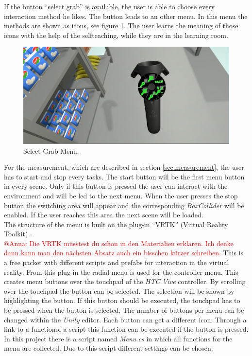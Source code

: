 If the button ``select grab'' is available, the user is able to choose every interaction method he likes. The button leads to an other menu. In this menu the methods are shown as icons, see figure \ref{fig:grabMenu}. The user learns the meaning of those icons with the help of the selfteaching, while they are in the learning room. 

\begin{figure}[H] 
	\center 
	\includegraphics[width=12cm]{Images/Menu2.PNG}
	\caption[Select Grab Menu.]{Select Grab Menu.}
	\label{fig:grabMenu}
\end{figure}

For the measurement, which are described in section \ref{sec:measurement}, the user has to start and stop every tasks. The start button will be the first menu button in every scene. Only if this button is pressed the user can interact with the environment and will be led to the next menu. When the user presses the stop button the switching area will appear and the corresponding \textit{BoxCollider} \cite{website:BoxCollider} will be enabled. If the user reaches this area the next scene will be loaded.\\
The structure of the menu is built on the plug-in ``VRTK'' (Virtual Reality Toolkit) \cite{asset_VRTK} \cite{VRTK}.\\
\textcolor{red}{@Anna: Die VRTK müsstest du schon in den Materialien erklären. Ich denke dann kann man den nächsten Absatz auch ein bisschen kürzer schreiben.}
This is a free packet with different scripts and prefabs for interaction in the virtual reality. From this plug-in the radial menu is used for the controller menu. This creates menu buttons over the touchpad of the \textit{HTC Vive} controller. By scrolling over the touchpad the button can be selected. The selection will be shown by highlighting the button. If this button should be executed, the touchpad has to be pressed when the button is selected. The number of buttons per menu can be changed within the \textit{Unity} editor. Each button can get a different icon. Through a link to a functionof a script this function can be executed if the button is pressed. In this project there is a script named \textit{Menu.cs} in which all functions for the menu are collected. Due to this script different settings can be chosen.


